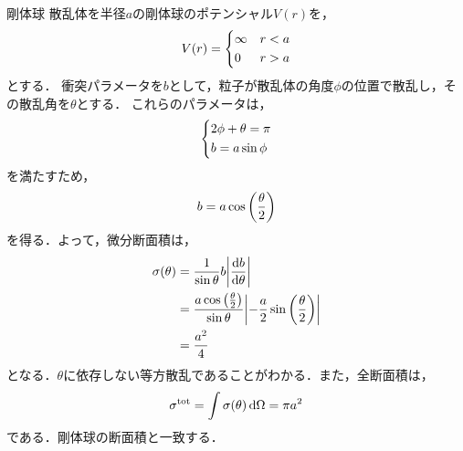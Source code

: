 \documentclass{report}
\begin{document}
  \begin{myex}{剛体球}{}
    散乱体を半径$a$の剛体球のポテンシャル$V(r)$を，
    \begin{align}
      V(r) = 
      \begin{dcases}
        \infty & r < a \\
        0 & r > a
      \end{dcases}
    \end{align}
    とする．
    衝突パラメータを$b$として，粒子が散乱体の角度$\phi$の位置で散乱し，その散乱角を$\theta$とする．
    これらのパラメータは，
    \begin{align}
      \begin{dcases}
        2\phi + \theta = \pi\\
        b = a\sin \phi
      \end{dcases}
    \end{align}
    を満たすため，
    \begin{align}
      b = a\cos\qty(\frac{\theta}{2})
    \end{align}
    を得る．よって，微分断面積は，
    \begin{align}
      \sigma(\theta) &= \frac{1}{\sin \theta} b \abs{\dv{b}{\theta}} \\
      &= \frac{a\cos\qty(\frac{\theta}{2})}{\sin\theta}\abs{-\frac{a}{2}\sin\qty(\frac{\theta}{2})} \\ 
      &= \frac{a^2}{4}
    \end{align}
    となる．$\theta$に依存しない等方散乱であることがわかる．また，全断面積は，
    \begin{align}
      \sigma^{\mathrm{tot}} = \int \sigma(\theta) \dd{\Omega} = \pi a^2
    \end{align}
    である．剛体球の断面積と一致する．
  \end{myex}
\end{document}
